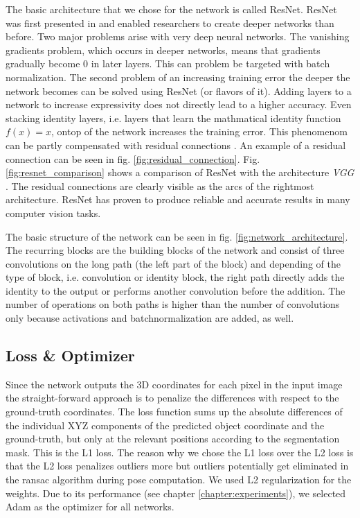 The basic architecture that we chose for the network is called ResNet. ResNet was first presented in \cite{resnet} and enabled researchers to create deeper networks than before. Two major problems arise with very deep neural networks. The vanishing gradients problem, which occurs in deeper networks, means that gradients gradually become 0 in later layers. This can problem be targeted with batch normalization. The second problem of an increasing training error the deeper the network becomes can be solved using ResNet (or flavors of it). Adding layers to a network to increase expressivity does not directly lead to a higher accuracy. Even stacking identity layers, i.e. layers that learn the mathmatical identity function $f(x) = x$, ontop of the network increases the training error. This phenomenom can be partly compensated with residual connections \cite{resnet}. An example of a residual connection can be seen in fig. \ref{fig:residual_connection}. Fig. \ref{fig:resnet_comparison} shows a comparison of ResNet with the architecture \textit{VGG} \cite{vgg}. The residual connections are clearly visible as the arcs of the rightmost architecture. ResNet has proven to produce reliable and accurate results in many computer vision tasks.

The basic structure of the network can be seen in fig. \ref{fig:network_architecture}. The recurring blocks are the building blocks of the network and consist of three convolutions on the long path (the left part of the block) and depending of the type of block, i.e. convolution or identity block, the right path directly adds the identity to the output or performs another convolution before the addition. The number of operations on both paths is higher than the number of convolutions only because activations and batchnormalization are added, as well.

\subsection{Loss \& Optimizer}

Since the network outputs the 3D coordinates for each pixel in the input image the straight-forward approach is to penalize the differences with respect to the ground-truth coordinates. The loss function sums up the absolute differences of the individual XYZ components of the predicted object coordinate and the ground-truth, but only at the relevant positions according to the segmentation mask. This is the L1 loss. The reason why we chose the L1 loss over the L2 loss is that the L2 loss penalizes outliers more but outliers potentially get eliminated in the \gls{ransac} algorithm during pose computation. We used L2 regularization for the weights. Due to its performance (see chapter \ref{chapter:experiments}), we selected Adam as the optimizer for all networks.

